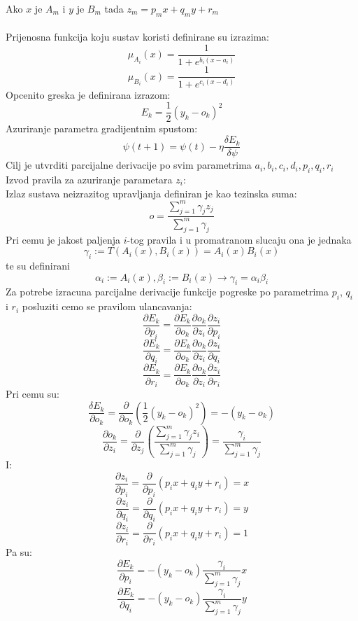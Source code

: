 \documentclass[a4paper, 11pt]{article}
\begin{document}
Ako $x$ je $A_{m}$ i $y$ je $B_{m}$ tada $z_{m}=p_{m}x+q_{m}y+r_{m}$\\
\\
Prijenosna funkcija koju sustav koristi definirane su izrazima:
$$\mu_{A_{i}}(x)=\frac{1}{1+e^{b_{i}(x-a_{i})}}$$
$$\mu_{B_{i}}(x)=\frac{1}{1+e^{c_{i}(x-d_{i})}}$$
Opcenito greska je definirana izrazom:
$$E_{k}=\frac{1}{2}(y_{k}-o_{k})^{2}$$
Azuriranje parametra gradijentnim spustom:
$$\psi(t+1) = \psi(t)-\eta\frac{\delta E_{k}}{\delta\psi}$$
Cilj je utvrditi parcijalne derivacije po svim parametrima $a_{i},b_{i},c_{i},d_{i},p_{i},q_{i},r_{i}$\\
Izvod pravila za azuriranje parametara $z_{i}$:\\
Izlaz sustava neizrazitog upravljanja definiran je kao tezinska suma:
$$o = \frac{\sum_{j=1}^{m}\gamma_{j}z_{j}}{\sum_{j=1}^{m}\gamma_{j}}$$
Pri cemu je jakost paljenja $i$-tog pravila i u promatranom slucaju ona je jednaka 
$$\gamma _{i} := T(A_{i}(x),B_{i}(x)) = A_{i}(x)B_{i}(x)$$ te su definirani 
$$\alpha_{i} := A_{i}(x),\beta_{i} := B_{i}(x) \rightarrow \gamma_{i} = \alpha_{i}\beta_{i}$$
Za potrebe izracuna parcijalne derivacije funkcije pogreske po parametrima $p_{i}$, $q_{i}$ i $r_{i}$ posluziti cemo se pravilom ulancavanja:
$$\frac{\partial E_{k}}{\partial p_{i}}=\frac{\partial E_{k}}{\partial o_{k}}\frac{\partial o_{k}}{\partial z_{i}}\frac{\partial z_{i}}{\partial p_{i}}$$
$$\frac{\partial E_{k}}{\partial q_{i}}=\frac{\partial E_{k}}{\partial o_{k}}\frac{\partial o_{k}}{\partial z_{i}}\frac{\partial z_{i}}{\partial q_{i}}$$
$$\frac{\partial E_{k}}{\partial r_{i}}=\frac{\partial E_{k}}{\partial o_{k}}\frac{\partial o_{k}}{\partial z_{i}}\frac{\partial z_{i}}{\partial r_{i}}$$
Pri cemu su:
\newcommand{\minusdEkdok}{(y_{k}-o_{k})}
$$\frac{\delta E_{k}}{\partial o_{k}} = \frac{\partial}{\partial o_{k}}\left (\frac{1}{2}(y_{k}-o_{k})^{2}\right )=-\minusdEkdok$$
\newcommand{\dokdzi}{\frac{\gamma_{i}}{\sum_{j=1}^{m}\gamma_{j}}}
\newcommand{\outfunc}{p_{i}x+q_{i}y+r_{i}}
$$\frac{\partial o_{k}}{\partial z_{i}} = \frac{\partial}{\partial z_{j}}\left (\frac{\sum_{j=1}^{m}\gamma_{j}z_{i}}{\sum_{j=1}^{m}\gamma_{j}}\right ) = \dokdzi$$
I:
$$\frac{\partial z_{i}}{\partial p_{i}} = \frac{\partial}{\partial p_{i}}(\outfunc) = x$$
$$\frac{\partial z_{i}}{\partial q_{i}} = \frac{\partial}{\partial q_{i}}(\outfunc) = y$$
$$\frac{\partial z_{i}}{\partial r_{i}} = \frac{\partial}{\partial r_{i}}(\outfunc) = 1$$
Pa su:
$$\frac{\partial E_{k}}{\partial p_{i}}=-\minusdEkdok\dokdzi x$$
$$\frac{\partial E_{k}}{\partial q_{i}}=-\minusdEkdok\dokdzi y$$
\end{document}
